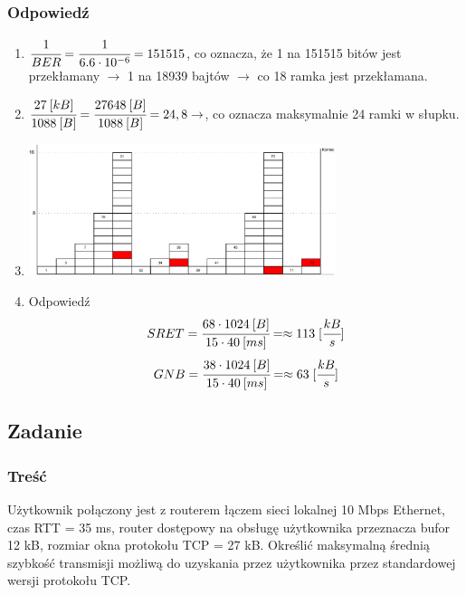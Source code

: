 		\subsubsection{Odpowiedź}
		\begin{enumerate}
			\item $ \cfrac{1}{BER}=\cfrac{1}{6.6\cdot 10^{-6}}=151515$, co oznacza, że 1 na 151515 bitów jest przekłamany $ \rightarrow $ 1 na 18939 bajtów $ \rightarrow $ co 18 ramka jest przekłamana.\\
			\item $ \cfrac{27\:[kB]}{1088\:[B]}=\cfrac{27648\:[B]}{1088\:[B]}=24,8 \rightarrow $, co oznacza maksymalnie 24 ramki w słupku.
			\item
				\begin{center}
					\includegraphics[width=9.0cm]{./images/zadanie14.pdf}
				\end{center}
			\item Odpowiedź
			$$ SRET=\cfrac{68\cdot1024\:[B]}{15\cdot40\:[ms]}=\approx113\;[\cfrac{kB}{s}]$$
			$$ GNB=\cfrac{38\cdot1024\:[B]}{15\cdot40\:[ms]}=\approx63\;[\cfrac{kB}{s}]$$
		\end{enumerate}
\newpage
	\subsection{Zadanie}
		\subsubsection{Treść}
			Użytkownik połączony jest z routerem łączem sieci lokalnej 10 Mbps Ethernet, czas RTT = 35 ms, router dostępowy na obsługę użytkownika przeznacza bufor 12 kB, rozmiar okna protokołu TCP = 27 kB. Określić maksymalną średnią szybkość transmisji możliwą do uzyskania przez użytkownika przez standardowej wersji protokołu TCP.
